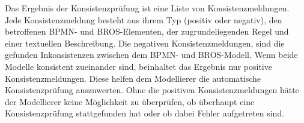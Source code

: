 Das Ergebnis der Konsistenzprüfung ist eine Liste von Konsistenzmeldungen.
Jede Konsistenzmeldung besteht aus ihrem Typ (positiv oder negativ), den betroffenen BPMN- und BROS-Elementen, der zugrundeliegenden Regel und einer textuellen Beschreibung.
Die negativen Konsistenzmeldungen, sind die gefunden Inkonsistenzen zwischen dem BPMN- und BROS-Modell.
Wenn beide Modelle konsistent zueinander sind, beinhaltet das Ergebnis nur positive Konsistenzmeldungen.
Diese helfen dem Modellierer die automatische Konsistenzprüfung auszuwerten.
Ohne die positiven Konsistenzmeldungen hätte der Modellierer keine Möglichkeit zu überprüfen, ob überhaupt eine Konsistenzprüfung stattgefunden hat oder ob dabei Fehler aufgetreten sind.
